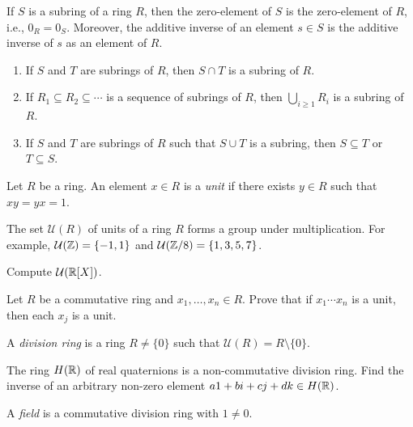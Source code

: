 If $S$ is a subring of a ring $R$, then the zero-element 
of $S$ is the zero-element of $R$, i.e., $0_R=0_S$. Moreover, 
the additive inverse of an element $s\in S$ 
is the additive inverse of $s$ as an element of $R$. 	

\begin{exercise}
  \leavevmode
  \label{xca:subrings}
  \begin{enumerate}
    \item If $S$ and $T$ are subrings of $R$, then $S\cap T$ is a subring of $R$.
    \item If $R_1\subseteq R_2\subseteq\cdots$ is a sequence of subrings of $R$, then 
      $\bigcup_{i\geq1}R_i$ is a subring of $R$. 
    \item If $S$ and $T$ are subrings of $R$ such that $S\cup T$ is a subring, then $S\subseteq T$ or  $T\subseteq S$.
  \end{enumerate}
\end{exercise}

\begin{definition}
	Let $R$ be a ring. An element $x\in R$ is 
	a \emph{unit} if there exists $y\in R$ such that $xy=yx=1$. 
\end{definition}

The set $\mathcal{U}(R)$ of units of a ring $R$ forms  
a group under multiplication. For example, $\mathcal{U}(\mathbb{Z})=\{-1,1\}$ and 
$\mathcal{U}(\mathbb{Z}/8)=\{1,3,5,7\}$. 

\begin{exercise}
\label{xca:units_R[X]}
Compute $\mathcal{U}(\mathbb{R}[X])$.
\end{exercise}

\begin{exercise}
  \label{xca:units}
  Let $R$ be a commutative ring and $x_1,\dots,x_n\in R$.  Prove that if
  $x_1\cdots x_n$ is a unit, then each $x_j$ is a unit. 
\end{exercise}

\begin{definition}
	A \emph{division ring} is a ring $R\neq\{0\}$ 
	such that $\mathcal{U}(R)=R\setminus\{0\}$.  	
\end{definition}

The ring $H(\mathbb{R})$ of real quaternions is a non-commutative division ring.
Find the inverse of an arbitrary non-zero element $a1+bi+cj+dk\in H(\mathbb{R})$. 

\begin{definition}
	A \emph{field} is a commutative division ring with $1\ne 0$. 
\end{definition}

